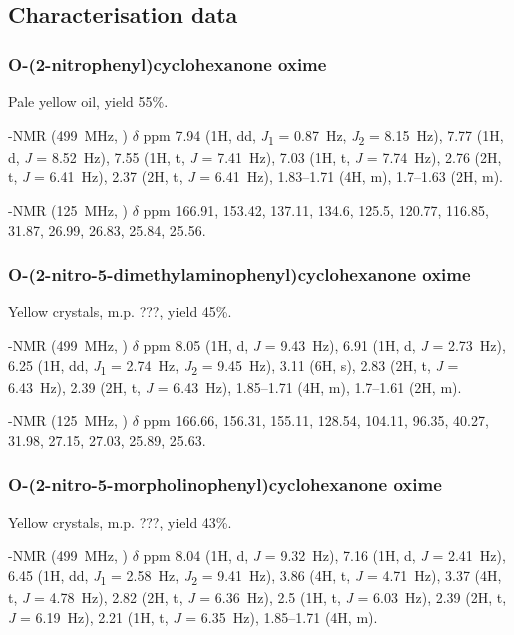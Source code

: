 \begin{refsection}
\subsection{Characterisation data}

\subsubsection{O-(2-nitrophenyl)cyclohexanone oxime }

Pale yellow oil, yield 55\%.

-NMR (499~MHz, ) $\delta$ ppm 7.94 (1H, dd, \textit{J}\textsubscript{1} = 0.87~Hz, \textit{J}\textsubscript{2} = 8.15~Hz), 7.77 (1H, d, \textit{J} = 8.52~Hz), 7.55 (1H, t, \textit{J} = 7.41~Hz), 7.03 (1H, t, \textit{J} = 7.74~Hz), 2.76 (2H, t, \textit{J} = 6.41~Hz), 2.37 (2H, t, \textit{J} = 6.41~Hz), 1.83--1.71 (4H, m), 1.7--1.63 (2H, m).

-NMR (125~MHz, ) $\delta$ ppm 166.91, 153.42, 137.11, 134.6, 125.5, 120.77, 116.85, 31.87, 26.99, 26.83, 25.84, 25.56.

\subsubsection{O-(2-nitro-5-dimethylaminophenyl)cyclohexanone oxime }

Yellow crystals, m.p. ???, yield 45\%.

-NMR (499~MHz, ) $\delta$ ppm 8.05 (1H, d, \textit{J} = 9.43~Hz), 6.91 (1H, d, \textit{J} = 2.73~Hz), 6.25 (1H, dd, \textit{J}\textsubscript{1} = 2.74~Hz, \textit{J}\textsubscript{2} = 9.45~Hz), 3.11 (6H, s), 2.83 (2H, t, \textit{J} = 6.43~Hz), 2.39 (2H, t, \textit{J} = 6.43~Hz), 1.85--1.71 (4H, m), 1.7--1.61 (2H, m).

-NMR (125~MHz, ) $\delta$ ppm 166.66, 156.31, 155.11, 128.54, 104.11, 96.35, 40.27, 31.98, 27.15, 27.03, 25.89, 25.63.

\subsubsection{O-(2-nitro-5-morpholinophenyl)cyclohexanone oxime }

Yellow crystals, m.p. ???, yield 43\%.

-NMR (499~MHz, ) $\delta$ ppm 8.04 (1H, d, \textit{J} = 9.32~Hz), 7.16 (1H, d, \textit{J} = 2.41~Hz), 6.45 (1H, dd, \textit{J}\textsubscript{1} = 2.58~Hz, \textit{J}\textsubscript{2} = 9.41~Hz), 3.86 (4H, t, \textit{J} = 4.71~Hz), 3.37 (4H, t, \textit{J} = 4.78~Hz), 2.82 (2H, t, \textit{J} = 6.36~Hz), 2.5 (1H, t, \textit{J} = 6.03~Hz), 2.39 (2H, t, \textit{J} = 6.19~Hz), 2.21 (1H, t, \textit{J} = 6.35~Hz), 1.85--1.71 (4H, m).


\end{refsection}
